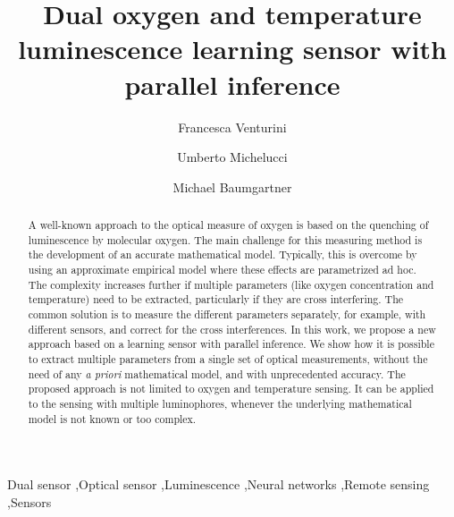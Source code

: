 \documentclass[final,5p,times,twocolumn]{elsarticle}
\begin{document}
\begin{frontmatter}

\title{Dual oxygen and temperature luminescence learning sensor with parallel inference}

\author[zhaw,toelt]{Francesca Venturini}
\author[toelt]{Umberto Michelucci}
\author[zhaw]{Michael Baumgartner}


\address[zhaw]{Institute of Applied Mathematics and Physics, Zurich University of Applied Sciences, Technikumstrasse 9, 8401 Winterthur, Switzerland}
\address[toelt]{TOELT llc, Birchlenstr. 25, 8600 D\"ubendorf}



\begin{abstract}
A well-known approach to the optical measure of oxygen is based on the quenching of luminescence by molecular oxygen. The main challenge for this measuring method is the development of an accurate mathematical model. Typically, this is overcome by using an approximate empirical model where these effects are parametrized ad hoc. The complexity increases further if multiple parameters (like oxygen concentration and temperature) need to be extracted, particularly if they are cross interfering. The common solution is to measure the different parameters separately, for example, with different sensors, and correct for the cross interferences.
In this work, we propose a new approach based on a learning sensor with parallel inference. We show how it is possible to extract multiple parameters from a single set of optical measurements, without the need of any {\sl a priori} mathematical model, and with unprecedented accuracy. The proposed approach is not limited to oxygen and temperature sensing. It can be applied to the sensing with multiple luminophores, whenever the underlying mathematical model is not known or too complex.
\end{abstract}


\begin{keyword}
Dual sensor \sep Optical sensor \sep Luminescence \sep Neural networks \sep Remote sensing \sep Sensors


\end{keyword}

\end{frontmatter}
\end{document}
